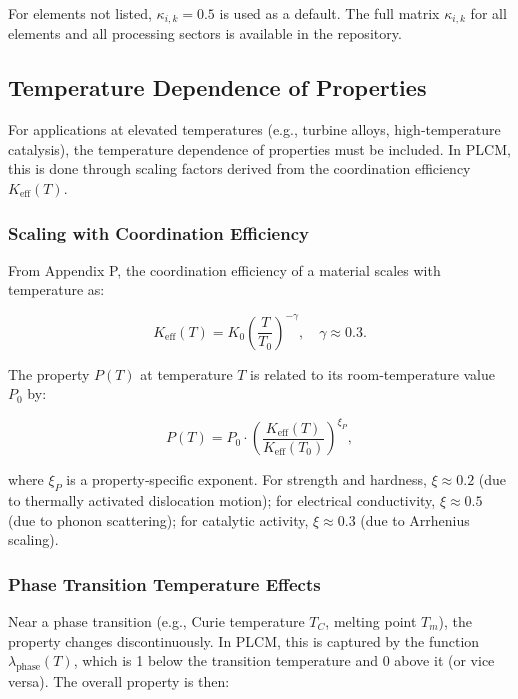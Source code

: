 \documentclass[12pt,a4paper]{article}
\newcommand{\Keff}{K_{\mathrm{eff}}}
\begin{document}
	For elements not listed, \(\kappa_{i,k}=0.5\) is used as a default. The full matrix \(\kappa_{i,k}\) for all elements and all processing sectors is available in the repository.
	
	\subsection{Temperature Dependence of Properties}
	\label{subsec:temperature-dependence}
	
	For applications at elevated temperatures (e.g., turbine alloys, high‑temperature catalysis), the temperature dependence of properties must be included. In PLCM, this is done through scaling factors derived from the coordination efficiency \(\Keff(T)\).
	
	\subsubsection{Scaling with Coordination Efficiency}
	
	From Appendix P, the coordination efficiency of a material scales with temperature as:
	
	\begin{equation}
		\Keff(T) = K_0 \left( \frac{T}{T_0} \right)^{-\gamma}, \quad \gamma \approx 0.3.
		\label{eq:keff-T}
	\end{equation}
	
	The property \(P(T)\) at temperature \(T\) is related to its room‑temperature value \(P_0\) by:
	
	\begin{equation}
		P(T) = P_0 \cdot \left( \frac{\Keff(T)}{\Keff(T_0)} \right)^{\xi_P},
		\label{eq:property-T-scaling}
	\end{equation}
	
	where \(\xi_P\) is a property‑specific exponent. For strength and hardness, \(\xi \approx 0.2\) (due to thermally activated dislocation motion); for electrical conductivity, \(\xi \approx 0.5\) (due to phonon scattering); for catalytic activity, \(\xi \approx 0.3\) (due to Arrhenius scaling).
	
	\subsubsection{Phase Transition Temperature Effects}
	
	Near a phase transition (e.g., Curie temperature \(T_C\), melting point \(T_m\)), the property changes discontinuously. In PLCM, this is captured by the function \(\lambda_{\text{phase}}(T)\), which is 1 below the transition temperature and 0 above it (or vice versa). The overall property is then:
	
\end{document}
